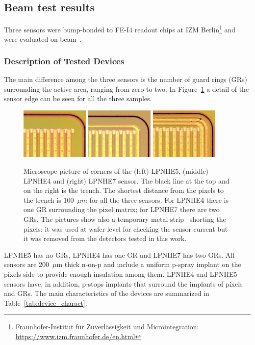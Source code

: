 \subsection{Beam test results}
Three sensors were bump-bonded to FE-I4 readout chips at IZM Berlin\footnote{Fraunhofer-Institut f\"ur Zuverl\"assigkeit und Microintegration: \url{https://www.izm.fraunhofer.de/en.html}} and were evaluated on beam~\cite{1748-0221-12-05-P05006}.

\subsubsection{Description of Tested Devices}
The main difference among the three sensors is  the number of guard rings (GRs) surrounding the active area, ranging from zero to two. In Figure~\ref{fig:lpnhe5_4_7_pic} a detail of the
sensor edge can be seen for all the three samples.

\begin{figure}[!htb]
\centering
\includegraphics[width=0.30\textwidth]{fei4_100um_0GRs.jpeg}
\includegraphics[width=0.30\textwidth]{fei4_100um_1GRs.jpeg}
\includegraphics[width=0.30\textwidth]{fei4_100um_2GRs.jpeg}
\caption{\label{fig:lpnhe5_4_7_pic}Microscope picture of corners of the  (left) LPNHE5, (middle) LPNHE4  and (right) LPNHE7 sensor. The black line at the top and on the right is the trench. The  shortest distance from the pixels to the trench is 100~$\mu m$ for all the three sensors. For LPNHE4 there is  one GR surrounding the pixel matrix; for LPNHE7 there are two GRs. The pictures show also a temporary metal strip~\cite{bib:metal} shorting the pixels: it was used at wafer level for checking the sensor current  but it was removed from the detectors tested in this work.}
\end{figure}
LPNHE5 has no GRs, LPNHE4 has one GR and LPNHE7 has two GRs. All sensors are 200~$\mu$m thick n-on-p and include a uniform p-spray implant on the pixels side to provide enough insulation among them. LPNHE4 and LPNHE5 sensors have, in addition, p-stops implants that surround the implants of pixels and GRs.
The main  characteristics of the devices are summarized in Table~\ref{tab:device_charact}.

